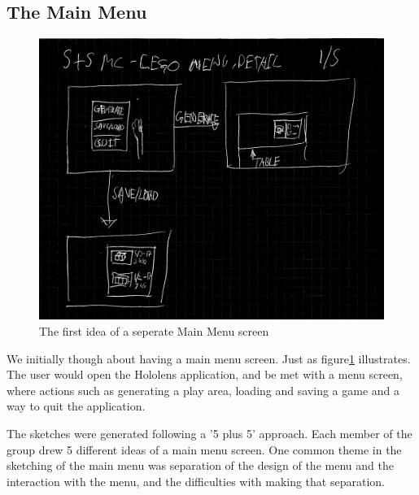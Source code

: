 \subsection{The Main Menu}
\begin{figure}[h]
	\centering
	\includegraphics[width=0.7\linewidth]{figures/Menu/menu8}
	\caption{The first idea of a seperate Main Menu screen}
	\label{fig:menu8}
\end{figure}
We initially though about having a main menu screen. Just as figure\ref{fig:menu8} illustrates. The user would open the Hololens application, and be met with a menu screen, where actions such as generating a play area, loading and saving a game and a way to quit the application. \par
The sketches were generated following a '5 plus 5' approach. Each member of the group drew 5 different ideas of a main menu screen. One common theme in the sketching of the main menu was separation of the design of the menu and the interaction with the menu, and the difficulties with making that separation.\par
